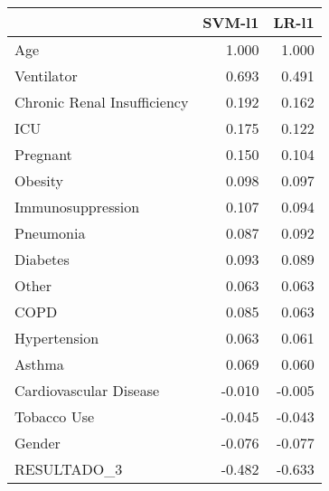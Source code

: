 \begin{tabular}{lrr}
\toprule
{} &  SVM-l1 &  LR-l1 \\
\midrule
Age                         &   1.000 &  1.000 \\
Ventilator                  &   0.693 &  0.491 \\
Chronic Renal Insufficiency &   0.192 &  0.162 \\
ICU                         &   0.175 &  0.122 \\
Pregnant                    &   0.150 &  0.104 \\
Obesity                     &   0.098 &  0.097 \\
Immunosuppression           &   0.107 &  0.094 \\
Pneumonia                   &   0.087 &  0.092 \\
Diabetes                    &   0.093 &  0.089 \\
Other                       &   0.063 &  0.063 \\
COPD                        &   0.085 &  0.063 \\
Hypertension                &   0.063 &  0.061 \\
Asthma                      &   0.069 &  0.060 \\
Cardiovascular Disease      &  -0.010 & -0.005 \\
Tobacco Use                 &  -0.045 & -0.043 \\
Gender                      &  -0.076 & -0.077 \\
RESULTADO\_3                 &  -0.482 & -0.633 \\
\bottomrule
\end{tabular}
